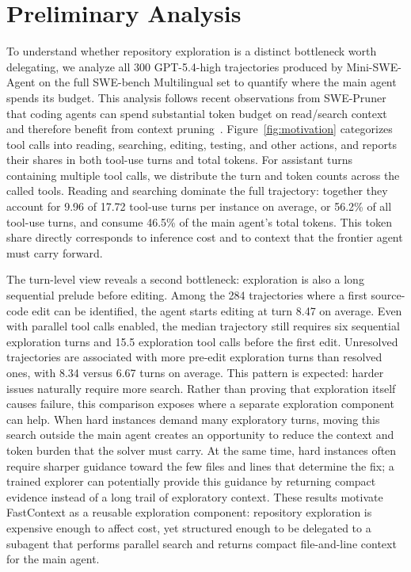 \documentclass[11pt]{article}
\newcommand{\approach}{{FastContext}\xspace}
\begin{document}
\section{Preliminary Analysis}
\label{sec:motivation}
\vspace{-2mm}
To understand whether repository exploration is a distinct bottleneck worth delegating, we analyze all 300 GPT-5.4-high trajectories produced by Mini-SWE-Agent on the full SWE-bench Multilingual set to quantify where the main agent spends its budget.
This analysis follows recent observations from SWE-Pruner that coding agents can spend substantial token budget on read/search context and therefore benefit from context pruning~\cite{swepruner}.
Figure~\ref{fig:motivation} categorizes tool calls into reading, searching, editing, testing, and other actions, and reports their shares in both tool-use turns and total tokens.
For assistant turns containing multiple tool calls, we distribute the turn and token counts across the called tools.
Reading and searching dominate the full trajectory: together they account for 9.96 of 17.72 tool-use turns per instance on average, or 56.2\% of all tool-use turns, and consume 46.5\% of the main agent's total tokens.
This token share directly corresponds to inference cost and to context that the frontier agent must carry forward.

The turn-level view reveals a second bottleneck: exploration is also a long sequential prelude before editing.
Among the 284 trajectories where a first source-code edit can be identified, the agent starts editing at turn 8.47 on average.
Even with parallel tool calls enabled, the median trajectory still requires six sequential exploration turns and 15.5 exploration tool calls before the first edit.
Unresolved trajectories are associated with more pre-edit exploration turns than resolved ones, with 8.34 versus 6.67 turns on average.
This pattern is expected: harder issues naturally require more search.
Rather than proving that exploration itself causes failure, this comparison exposes where a separate exploration component can help.
When hard instances demand many exploratory turns, moving this search outside the main agent creates an opportunity to reduce the context and token burden that the solver must carry.
At the same time, hard instances often require sharper guidance toward the few files and lines that determine the fix; a trained explorer can potentially provide this guidance by returning compact evidence instead of a long trail of exploratory context.
These results motivate \approach as a reusable exploration component: repository exploration is expensive enough to affect cost, yet structured enough to be delegated to a subagent that performs parallel search and returns compact file-and-line context for the main agent.
\end{document}
